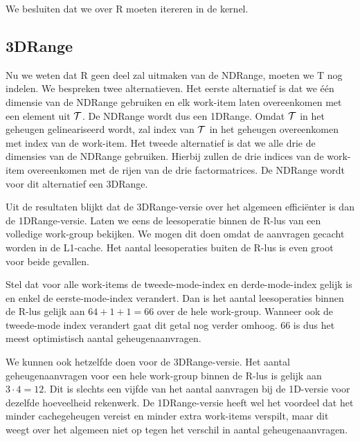 We besluiten dat we over R moeten itereren in de kernel.

\subsection{3DRange}
Nu we weten dat R geen deel zal uitmaken van de NDRange, moeten we T nog indelen. We bespreken twee alternatieven. Het eerste alternatief is dat we \'e\'en dimensie van de NDRange gebruiken en elk work-item laten overeenkomen met een element uit $\mathcal{T}$. De NDRange wordt dus een 1DRange. Omdat $\mathcal{T}$ in het geheugen gelineariseerd wordt, zal index van $\mathcal{T}$ in het geheugen overeenkomen met index van de work-item.
Het tweede alternatief is dat we alle drie de dimensies van de NDRange gebruiken. Hierbij zullen de drie indices van de work-item overeenkomen met de rijen van de drie factormatrices. De NDRange wordt voor dit alternatief een 3DRange.



Uit de resultaten blijkt dat de 3DRange-versie over het algemeen effici\"enter is dan de 1DRange-versie. Laten we eens de leesoperatie binnen de R-lus van een volledige work-group bekijken. We mogen dit doen omdat de aanvragen gecacht worden in de L1-cache. Het aantal leesoperaties buiten de R-lus is even groot voor beide gevallen.

Stel dat voor alle work-items de tweede-mode-index en derde-mode-index gelijk is en enkel de eerste-mode-index verandert. Dan is het aantal leesoperaties binnen de R-lus gelijk aan $64 + 1 + 1 = 66$ over de hele work-group. Wanneer ook de tweede-mode index verandert gaat dit getal nog verder omhoog. 66 is dus het meest optimistisch aantal geheugenaanvragen.

We kunnen ook hetzelfde doen voor de 3DRange-versie. Het aantal geheugenaanvragen voor een hele work-group binnen de R-lus is gelijk aan $3 \cdot 4 = 12$. Dit is slechts een vijfde van het aantal aanvragen bij de 1D-versie voor dezelfde hoeveelheid rekenwerk. De 1DRange-versie heeft wel het voordeel dat het minder cachegeheugen vereist en minder extra work-items verspilt, maar dit weegt over het algemeen niet op tegen het verschil in aantal geheugenaanvragen.

